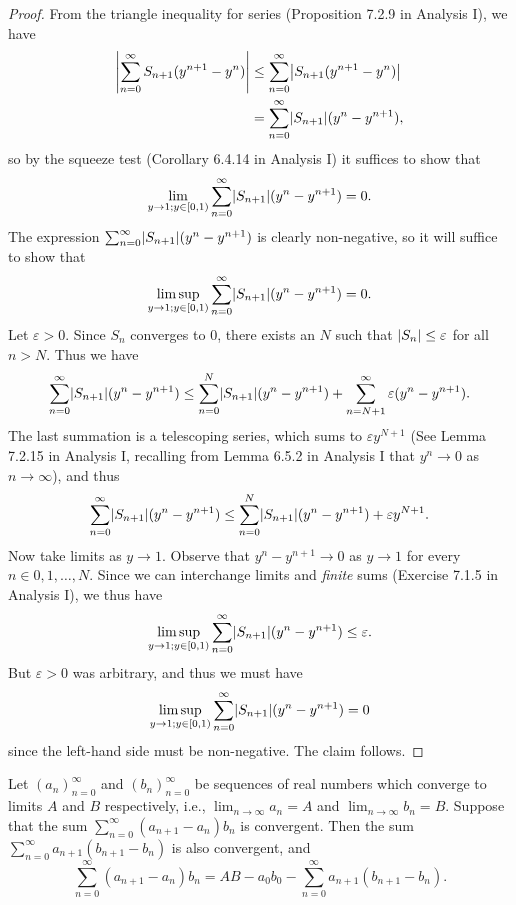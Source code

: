 \begin{proof}
    From the triangle inequality for series (Proposition 7.2.9 in Analysis I), we have
    \begin{align*}
        \abs*{\sum_{n = 0}^\infty S_{n + 1} (y^{n + 1} - y^n)} & \leq \sum_{n = 0}^\infty \abs*{S_{n + 1} (y^{n + 1} - y^n)} \\
                                                               & = \sum_{n = 0}^\infty \abs*{S_{n + 1}} (y^n - y^{n + 1}),
    \end{align*}
    so by the squeeze test (Corollary 6.4.14 in Analysis I) it suffices to show that
    \[
        \lim_{y \to 1 ; y \in [0, 1)} \sum_{n = 0}^\infty \abs*{S_{n + 1}} (y^n - y^{n + 1}) = 0.
    \]
    The expression \(\sum_{n = 0}^\infty \abs*{S_{n + 1}} (y^n - y^{n + 1})\) is clearly non-negative, so it will suffice to show that
    \[
        \limsup_{y \to 1 ; y \in [0, 1)} \sum_{n = 0}^\infty \abs*{S_{n + 1}} (y^n - y^{n + 1}) = 0.
    \]
    Let \(\varepsilon > 0\).
    Since \(S_n\) converges to \(0\), there exists an \(N\) such that \(\abs*{S_n} \leq \varepsilon\) for all \(n > N\).
    Thus we have
    \[
        \sum_{n = 0}^\infty \abs*{S_{n + 1}} (y^n - y^{n + 1}) \leq \sum_{n = 0}^N \abs*{S_{n + 1}} (y^n - y^{n + 1}) + \sum_{n = N + 1}^\infty \varepsilon (y^n - y^{n + 1}).
    \]
    The last summation is a telescoping series, which sums to \(\varepsilon y^{N + 1}\) (See Lemma 7.2.15 in Analysis I, recalling from Lemma 6.5.2 in Analysis I that \(y^n \to 0\) as \(n \to \infty\)), and thus
    \[
        \sum_{n = 0}^\infty \abs*{S_{n + 1}} (y^n - y^{n + 1}) \leq \sum_{n = 0}^N \abs*{S_{n + 1}} (y^n - y^{n + 1}) + \varepsilon y^{N + 1}.
    \]
    Now take limits as \(y \to 1\).
    Observe that \(y^n - y^{n + 1} \to 0\) as \(y \to 1\) for every \(n \in 0, 1, \dots, N\).
    Since we can interchange limits and \emph{finite} sums (Exercise 7.1.5 in Analysis I), we thus have
    \[
        \limsup_{y \to 1 ; y \in [0, 1)} \sum_{n = 0}^\infty \abs*{S_{n + 1}} (y^n - y^{n + 1}) \leq \varepsilon.
    \]
    But \(\varepsilon > 0\) was arbitrary, and thus we must have
    \[
        \limsup_{y \to 1 ; y \in [0, 1)} \sum_{n = 0}^\infty \abs*{S_{n + 1}} (y^n - y^{n + 1}) = 0
    \]
    since the left-hand side must be non-negative.
    The claim follows.
\end{proof}

\begin{lemma}\label{4.3.2}
    Let \((a_n)_{n = 0}^\infty\) and \((b_n)_{n = 0}^\infty\) be sequences of real numbers which converge to limits \(A\) and \(B\) respectively, i.e., \(\lim_{n \to \infty} a_n = A\) and \(\lim_{n \to \infty} b_n = B\).
    Suppose that the sum \(\sum_{n = 0}^\infty (a_{n + 1} - a_n) b_n\) is convergent.
    Then the sum \(\sum_{n = 0}^\infty a_{n + 1} (b_{n + 1} - b_n)\) is also convergent, and
    \[
        \sum_{n = 0}^\infty (a_{n + 1} - a_n) b_n = AB - a_0 b_0 - \sum_{n = 0}^\infty a_{n + 1} (b_{n + 1} - b_n).
    \]
\end{lemma}

